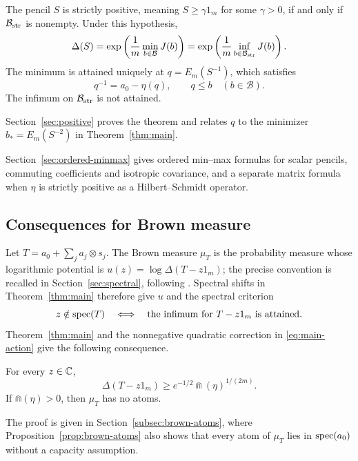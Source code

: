 \begin{theorem}\label{thm:positive}
The pencil $S$ is strictly positive, meaning $S\ge\gamma1_m$ for some $\gamma>0$, if and only if $\mathcal B_{\rm str}$ is nonempty.
Under this hypothesis,
\begin{equation}\label{eq:positive-minimum}
 \Delta(S)=\exp\left(\frac1m\min_{b\in\mathcal B}J(b)\right)
          =\exp\left(\frac1m\inf_{b\in\mathcal B_{\rm str}}J(b)\right).
\end{equation}
The minimum is attained uniquely at $q=E_m(S^{-1})$, which satisfies
\[
 q^{-1}=a_0-\eta(q),\qquad q\le b\quad(b\in\mathcal B).
\]
The infimum on $\mathcal B_{\rm str}$ is not attained.
\end{theorem}
Section~\ref{sec:positive} proves the theorem and relates $q$ to the minimizer $b_*=E_m(S^{-2})$ in Theorem~\ref{thm:main}.

Section~\ref{sec:ordered-minmax} gives ordered min--max formulas for scalar pencils, commuting coefficients and isotropic covariance, and a separate matrix formula when $\eta$ is strictly positive as a Hilbert--Schmidt operator.

\subsection{Consequences for Brown measure}
Let $T=a_0+\sum_j a_j\otimes s_j$.
The Brown measure $\mu_T$ is the probability measure whose logarithmic potential is $u(z)=\log\Delta(T-z1_m)$; the precise convention is recalled in Section~\ref{sec:spectral}, following \cite[Chapter 11, Section 9]{MS17}.
Spectral shifts in Theorem~\ref{thm:main} therefore give $u$ and the spectral criterion
\[
 z\notin\operatorname{spec}(T)
 \quad\Longleftrightarrow\quad
 \text{the infimum for $T-z1_m$ is attained}.
\]
Theorem~\ref{thm:main} and the nonnegative quadratic correction in \eqref{eq:main-action} give the following consequence.

\begin{corollary}\label{cor:brown-capacity}
For every $z\in\mathbb C$,
\begin{equation}\label{eq:intro-uniform-bound}
 \Delta(T-z1_m)\ge e^{-1/2}\Cap(\eta)^{1/(2m)}.
\end{equation}
If $\Cap(\eta)>0$, then $\mu_T$ has no atoms.
\end{corollary}
The proof is given in Section~\ref{subsec:brown-atoms}, where Proposition~\ref{prop:brown-atoms} also shows that every atom of $\mu_T$ lies in $\operatorname{spec}(a_0)$ without a capacity assumption.

